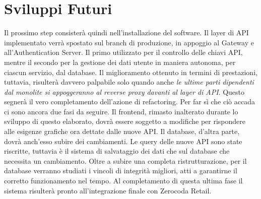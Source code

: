 \section*{Sviluppi Futuri}
Il prossimo step consisterà quindi nell'installazione del software. Il layer di API implementato verrà spostato sul branch di produzione, in appoggio al Gateway e all'Authentication Server. Il primo utilizzato per il controllo delle chiavi API, mentre il secondo per la gestione dei dati utente in maniera autonoma, per ciascun servizio, dal database. Il miglioramento ottenuto in termini di prestazioni, tuttavia, risulterà davvero palpabile solo quando anche \emph{le ultime parti dipendenti dal monolite si appoggeranno al reverse proxy davanti al layer di API}. Questo segnerà il vero completamento dell'azione di refactoring. Per far sì che ciò accada ci sono ancora due fasi da seguire. Il frontend, rimasto inalterato durante lo sviluppo di questo elaborato, dovrà essere soggetto a modifiche per rispondere alle esigenze grafiche ora dettate dalle nuove API. Il database, d'altra parte, dovrà anch'esso subire dei cambiamenti. Le query delle nuove API sono state riscritte, tuttavia è il sistema di salvataggio dei dati che sul database che necessita un cambiamento. Oltre a subire una completa ristrutturazione, per il database verranno studiati i vincoli di integrità migliori, atti a garantirne il corretto funzionamento nel tempo. Al completamento di questa ultima fase il sistema risulterà pronto all'integrazione finale con Zerocoda Retail. 

